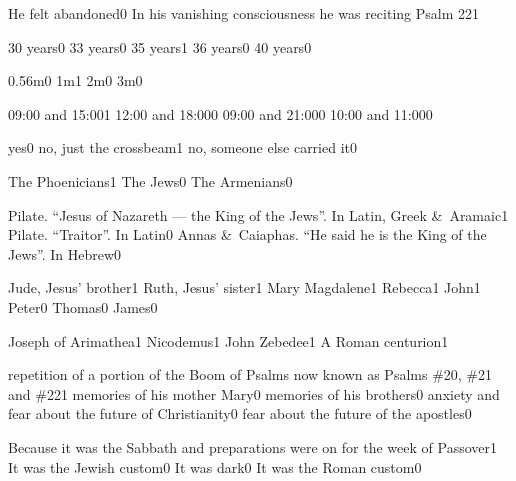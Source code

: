 {He felt abandoned}{0}
{In his vanishing consciousness he was reciting Psalm 22}{1}
\qstop

{30 years}{0}
{33 years}{0}
{35 years}{1}
{36 years}{0}
{40 years}{0}
\qstop

{0.56m}{0}
{1m}{1}
{2m}{0}
{3m}{0}
\qstop

{09:00 and 15:00}{1}
{12:00 and 18:00}{0}
{09:00 and 21:00}{0}
{10:00 and 11:00}{0}
\qstop

{yes}{0}
{no, just the crossbeam}{1}
{no, someone else carried it}{0}
\qstop

{The Phoenicians}{1}
{The Jews}{0}
{The Armenians}{0}
\qstop

{Pilate. ``Jesus of Nazareth --- the King of the Jews''. In Latin, Greek \&\ Aramaic}{1}
{Pilate. ``Traitor''. In Latin}{0}
{Annas \&\ Caiaphas. ``He said he is the King of the Jews''. In Hebrew}{0}
\qstop

{Jude, Jesus' brother}{1}
{Ruth, Jesus' sister}{1}
{Mary Magdalene}{1}
{Rebecca}{1}
{John}{1}
{Peter}{0}
{Thomas}{0}
{James}{0}
\qstop

{Joseph of Arimathea}{1}
{Nicodemus}{1}
{John Zebedee}{1}
{A Roman centurion}{1}
\qstop

{repetition of a portion of the Boom of Psalms now known as Psalms \#20, \#21 and \#22}{1}
{memories of his mother Mary}{0}
{memories of his brothers}{0}
{anxiety and fear about the future of Christianity}{0}
{fear about the future of the apostles}{0}
\qstop


{Because it was the Sabbath and preparations were on for the week of Passover}{1}
{It was the Jewish custom}{0}
{It was dark}{0}
{It was the Roman custom}{0}
\qstop

